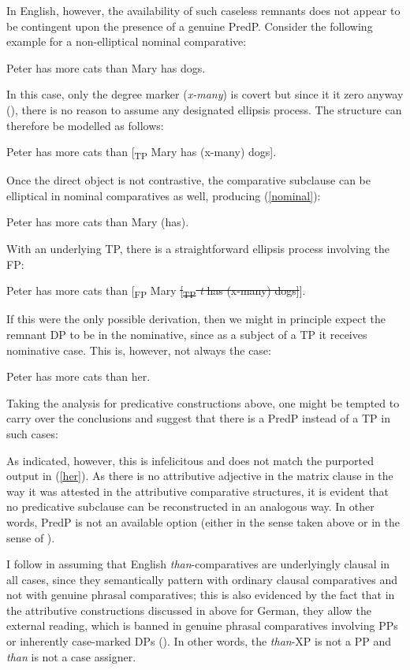 In English, however, the availability of such caseless remnants does not appear to be contingent upon the presence of a genuine PredP. Consider the following example for a non-elliptical nominal comparative:

\ea Peter has more cats than Mary has dogs.
\z

In this case, only the degree marker (\textit{x-many}) is covert but since it it zero anyway (\citealt[78--80]{bacskaiatkari2018langsci}), there is no reason to assume any designated ellipsis process. The structure can therefore be modelled as follows:

\ea Peter has more cats than [\textsubscript{TP} Mary has (x-many) dogs].
\z

Once the direct object is not contrastive, the comparative subclause can be elliptical in nominal comparatives as well, producing (\ref{nominal}):

\ea Peter has more cats than Mary (has). \label{nominal}
\z

With an underlying TP, there is a straightforward ellipsis process involving the FP:

\ea Peter has more cats than [\textsubscript{FP} Mary \sout{[\textsubscript{TP} \textit{t} has (x-many) dogs]}].
\z

If this were the only possible derivation, then we might in principle expect the remnant DP to be in the nominative, since as a subject of a TP it receives nominative case. This is, however, not always the case:

\ea Peter has more cats than her. \label{her}
\z

Taking the analysis for predicative constructions above, one might be tempted to carry over the conclusions and suggest that there is a PredP instead of a TP in such cases:

\z

As indicated, however, this is infelicitous and does not match the purported output in (\ref{her}). As there is no attributive adjective in the matrix clause in the way it was attested in the attributive comparative structures, it is evident that no predicative subclause can be reconstructed in an analogous way. In other words, PredP is not an available option (either in the sense taken above or in the sense of \citealt{pancheva2006}).

I follow \citet{pancheva2006} in assuming that English \textit{than}-comparatives are underlyingly clausal in all cases, since they semantically pattern with ordinary clausal comparatives and not with genuine phrasal comparatives; this is also evidenced by the fact that in the attributive constructions discussed in  above for German, they allow the external reading, which is banned in genuine phrasal comparatives involving PPs or inherently case-marked DPs (\citealt{bacskaiatkari2017icgl, bacskaiatkari2017atoh}). In other words, the \textit{than}-XP is not a PP and \textit{than} is not a case assigner.

